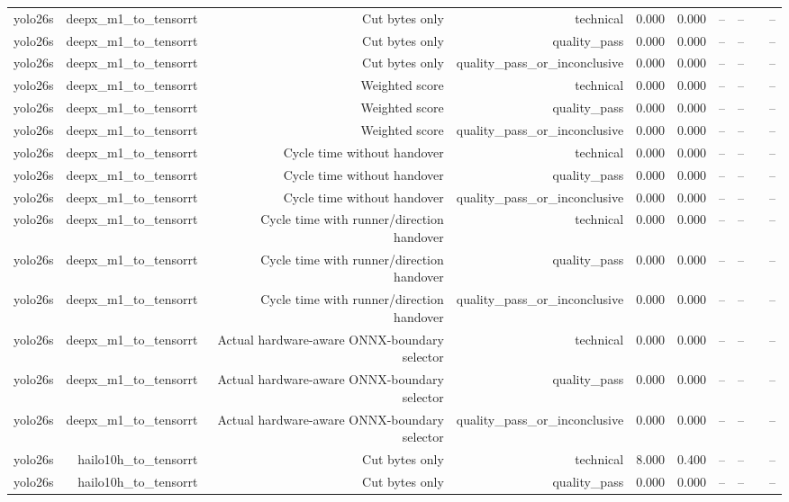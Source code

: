 \begin{table}[t]
\begin{tabular}{lrrrrrrrrr}
yolo26s & deepx\_m1\_to\_tensorrt & Cut bytes only & technical & 0.000 & 0.000 & -- & -- &  & -- \\
yolo26s & deepx\_m1\_to\_tensorrt & Cut bytes only & quality\_pass & 0.000 & 0.000 & -- & -- &  & -- \\
yolo26s & deepx\_m1\_to\_tensorrt & Cut bytes only & quality\_pass\_or\_inconclusive & 0.000 & 0.000 & -- & -- &  & -- \\
yolo26s & deepx\_m1\_to\_tensorrt & Weighted score & technical & 0.000 & 0.000 & -- & -- &  & -- \\
yolo26s & deepx\_m1\_to\_tensorrt & Weighted score & quality\_pass & 0.000 & 0.000 & -- & -- &  & -- \\
yolo26s & deepx\_m1\_to\_tensorrt & Weighted score & quality\_pass\_or\_inconclusive & 0.000 & 0.000 & -- & -- &  & -- \\
yolo26s & deepx\_m1\_to\_tensorrt & Cycle time without handover & technical & 0.000 & 0.000 & -- & -- &  & -- \\
yolo26s & deepx\_m1\_to\_tensorrt & Cycle time without handover & quality\_pass & 0.000 & 0.000 & -- & -- &  & -- \\
yolo26s & deepx\_m1\_to\_tensorrt & Cycle time without handover & quality\_pass\_or\_inconclusive & 0.000 & 0.000 & -- & -- &  & -- \\
yolo26s & deepx\_m1\_to\_tensorrt & Cycle time with runner/direction handover & technical & 0.000 & 0.000 & -- & -- &  & -- \\
yolo26s & deepx\_m1\_to\_tensorrt & Cycle time with runner/direction handover & quality\_pass & 0.000 & 0.000 & -- & -- &  & -- \\
yolo26s & deepx\_m1\_to\_tensorrt & Cycle time with runner/direction handover & quality\_pass\_or\_inconclusive & 0.000 & 0.000 & -- & -- &  & -- \\
yolo26s & deepx\_m1\_to\_tensorrt & Actual hardware-aware ONNX-boundary selector & technical & 0.000 & 0.000 & -- & -- &  & -- \\
yolo26s & deepx\_m1\_to\_tensorrt & Actual hardware-aware ONNX-boundary selector & quality\_pass & 0.000 & 0.000 & -- & -- &  & -- \\
yolo26s & deepx\_m1\_to\_tensorrt & Actual hardware-aware ONNX-boundary selector & quality\_pass\_or\_inconclusive & 0.000 & 0.000 & -- & -- &  & -- \\
yolo26s & hailo10h\_to\_tensorrt & Cut bytes only & technical & 8.000 & 0.400 & -- & -- &  & -- \\
yolo26s & hailo10h\_to\_tensorrt & Cut bytes only & quality\_pass & 0.000 & 0.000 & -- & -- &  & -- \\

\end{tabular}
\end{table}
